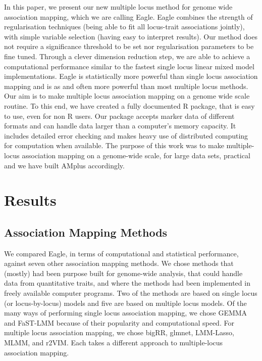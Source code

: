 \documentclass{nature}
\begin{document}
In this paper, we present our new multiple locus method for genome wide association mapping, which we are calling Eagle. Eagle combines the strength of regularisation techniques (being able to fit all locus-trait associations jointly), with simple variable selection (having easy to interpret results). Our method does not require a significance threshold to be set nor regularisation parameters to be fine tuned. Through a clever dimension reduction step, we are able to achieve a computational performance similar to the fastest single locus linear mixed model implementations. Eagle is statistically more powerful than single locus association mapping and is as and often more powerful than 
most multiple locus methods. Our aim is to make multiple locus association mapping on a genome wide scale routine. To this end, we have created a fully documented R package, that is easy to use, even for non R users.  Our package accepts marker data of different 
formats and can handle data larger than a computer's  memory capacity. It includes detailed error checking and makes heavy use of 
distributed computing for computation when available.  The purpose of this work was to make multiple-locus association mapping on 
a genome-wide scale, for large data sets,  practical and we have built AMplus accordingly. 


\section{Results}

\subsection{Association Mapping Methods}

We compared Eagle, in terms of computational and statistical performance, against seven other association mapping methods. 
We chose methods that (mostly) had been purpose built for genome-wide analysis, that could handle data from quantitative traits, and where the methods had been implemented in freely available computer programs. Two of the methods are based on single locus (or locus-by-locus) models and five are based on multiple locus models. Of the many ways of performing single locus association mapping, we chose GEMMA and FaST-LMM because of their popularity and computational speed. For multiple locus association mapping, we chose bigRR, glmnet, LMM-Lasso, MLMM, and r2VIM.  Each takes a different approach to multiple-locus association mapping.
\end{document}
